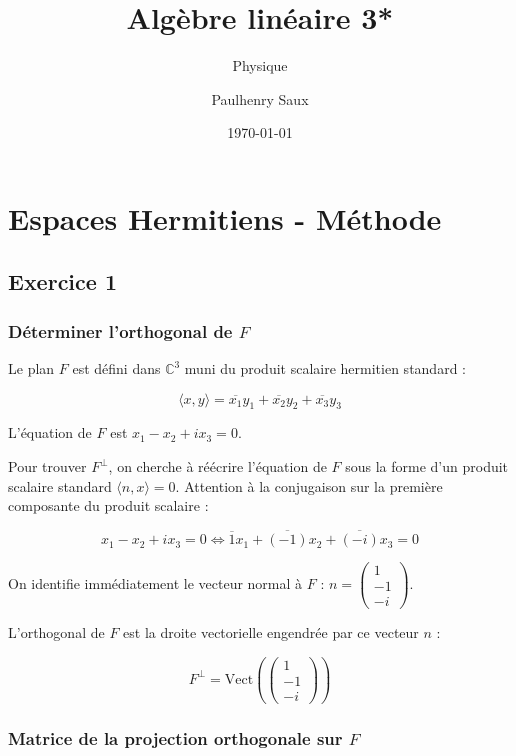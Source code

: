 \documentclass[french]{yLectureNote}
\title{Algèbre linéaire 3*}
\subtitle{Physique}
\author{Paulhenry Saux}
\date{\today}
\begin{document}
\setcounter{chapter}{2}
\chapter{Espaces Hermitiens - Méthode}

\section{Exercice 1}

\subsection{Déterminer l'orthogonal de $F$}


Le plan $F$ est défini dans $\mathbb{C}^3$ muni du produit scalaire hermitien standard :


$$\langle x, y \rangle = \overline{x_1}y_1 + \overline{x_2}y_2 + \overline{x_3}y_3$$


L'équation de $F$ est $x_1 - x_2 + ix_3 = 0$.


Pour trouver $F^\perp$, on cherche à réécrire l'équation de $F$ sous la forme d'un produit scalaire standard $\langle n, x \rangle = 0$.
Attention à la conjugaison sur la première composante du produit scalaire :


$$x_1 - x_2 + ix_3 = 0 \iff \overline{1}x_1 + \overline{(-1)}x_2 + \overline{(-i)}x_3 = 0$$

On identifie immédiatement le vecteur normal à $F$ : $n = \begin{pmatrix} 1 \\ -1 \\ -i \end{pmatrix}$.

L'orthogonal de $F$ est la droite vectorielle engendrée par ce vecteur $n$ :


$$F^\perp = \text{Vect}\left( \begin{pmatrix} 1 \\ -1 \\ -i \end{pmatrix} \right)$$

\subsection{Matrice de la projection orthogonale sur $F$}

\end{document}
